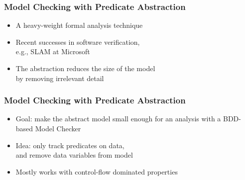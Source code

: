 
\begin{frame}
\frametitle{Model Checking with Predicate Abstraction}

\begin{itemize}

\item A \alert{heavy-weight} formal analysis technique
\vfill

\item Recent successes in software verification,\\
e.g., SLAM at Microsoft
\vfill

\item The abstraction reduces the size of the model\\
by {\color{ta3chameleon}removing irrelevant detail}

\end{itemize}

\end{frame}


\begin{frame}
\frametitle{Model Checking with Predicate Abstraction}

\begin{itemize}

\item Goal: make the abstract model
{\color{ta3chameleon}small enough} for
an analysis with a BDD-based Model Checker
\vfill

\item Idea: {\color{ta3chameleon}only track predicates on data},\\
and remove data variables from model
\vfill

\item Mostly works with \alert{control-flow dominated properties}

\end{itemize}

\end{frame}



